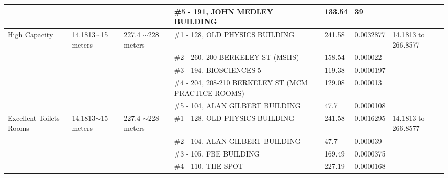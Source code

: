 \begin{table}[H]
{\begin{tabular}{|l|l|l|l|l|l|l|}
                        &                          &                                                 & \#5 - 191, JOHN MEDLEY BUILDING                       & 133.54        & 39              &                           \\ \hline
High Capacity           & 14.1813$\sim$15 meters   & 227.4 $\sim$228  meters                         & \#1 - 128, OLD PHYSICS BUILDING                       & 241.58        & 0.0032877       & 14.1813 to 266.8577       \\ \hline
                        &                          &                                                 & \#2 - 260, 200 BERKELEY ST (MSHS)                     & 158.54        & 0.000022        &                           \\ \hline
                        &                          &                                                 & \#3 - 194, BIOSCIENCES 5                              & 119.38        & 0.0000197       &                           \\ \hline
                        &                          &                                                 & \#4 - 204, 208-210 BERKELEY ST (MCM PRACTICE ROOMS)   & 129.08        & 0.000013        &                           \\ \hline
                        &                          &                                                 & \#5 - 104, ALAN GILBERT BUILDING                      & 47.7          & 0.0000108       &                           \\ \hline
Excellent Toilets Rooms & 14.1813$\sim$15 meters   & 227.4 $\sim$228  meters                         & \#1 - 128, OLD PHYSICS BUILDING                       & 241.58        & 0.0016295       & 14.1813 to 266.8577       \\ \hline
                        &                          &                                                 & \#2 - 104, ALAN GILBERT BUILDING                      & 47.7          & 0.000039        &                           \\ \hline
                        &                          &                                                 & \#3 - 105, FBE BUILDING                               & 169.49        & 0.0000375       &                           \\ \hline
                        &                          &                                                 & \#4 - 110, THE SPOT                                   & 227.19        & 0.0000168       &                           \\ \hline

\end{tabular}}
\end{table}
